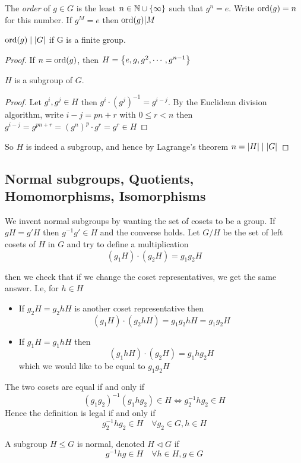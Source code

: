 \documentclass{article}
\begin{document}
\begin{defi}[Order]
    The \emph{order} of $g \in G$ is the least $n \in \mathbb{N} \cup \left\{ \infty \right\}$ such that $g^n = e$. Write $\operatorname{ord} (g) = n$ for this number.
    If $g^M = e$ then $\operatorname{ord} (g) | M$
\end{defi}
\begin{lemma}
    $\operatorname{ord} (g) \mid \left\lvert G\right\rvert$ if G is a finite group.
\end{lemma}
\begin{proof}
    If $n = \operatorname{ord} (g)$, then $H = \left\{ e, g, g^2, \cdots, g^{n-1} \right\}$
    \begin{claim}
        $H$ is a subgroup of $G$.
        \begin{proof}
            Let $g^i, g^j \in H$ then $g^i \cdot (g^j)^{-1} = g^{i - j}$.
            By the Euclidean division algorithm, write $i - j = pn + r$ with $0 \leq r < n$ then 
            $ g^{i - j} = g^{pn +r} = (g^n)^p \cdot g^r = g^r \in H $
        \end{proof}
    \end{claim}
    So $H$ is indeed a subgroup, and hence by Lagrange's theorem $n = \left\lvert H\right\rvert \mid \left\lvert G\right\rvert$
\end{proof}

\subsection{Normal subgroups, Quotients, Homomorphisms, Isomorphisms}
We invent normal subgroups by wanting the set of cosets to be a group. If $gH = g'H$ then $g^{-1}g' \in H$ and the converse holds. 
Let $G / H$ be the set of left cosets of $H$ in $G$ and try to define a multiplication $$ (g_1H) \cdot (g_2H) = g_1g_2H $$ 

then we check that if we change the coset representatives, we get the same answer. I.e, for $h \in H$
\begin{itemize}
    \item If $g_2H = g_2hH$ is another coset representative then $$ (g_1H) \cdot (g_2h H) = g_1 g_2h H = g_1g_2 H $$ 
    \item If $g_1H = g_1hH$ then $$ (g_1hH) \cdot (g_2H) = g_1h g_2 H $$ which we would like to be equal to $g_1g_2H$
\end{itemize}
The two cosets are equal if and only if $$ (g_1g_2)^{-1}(g_1hg_2) \in H \iff g_2^{-1}hg_2 \in H$$
Hence the definition is legal if and only if $$g_2^{-1} h g_2 \in H \quad \forall g_2 \in G, h \in H$$

\begin{defi}[Normal]
    A subgroup $H \leq G$ is normal, denoted $H \triangleleft G$ if $$ g^{-1}hg \in H \quad \forall h \in H, g \in G $$
\end{defi}
\end{document}

